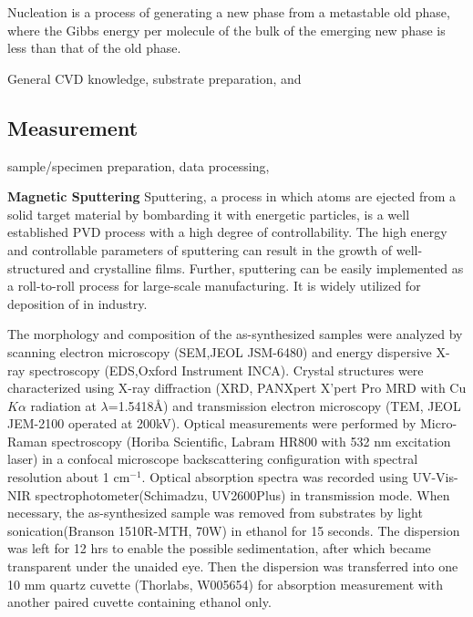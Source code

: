 Nucleation is a process of generating a new phase from a metastable old phase, where the Gibbs energy per molecule of the bulk of the emerging new phase is less than that of the old phase.

  General CVD knowledge, substrate preparation, and\cite{MichealK.Zuraw2003}

\subsection{Measurement}
sample/specimen preparation, data processing,

\textbf{Magnetic Sputtering} Sputtering, a process in which atoms are ejected from a solid target material by bombarding it with energetic particles, is a well established PVD process with a high degree of controllability. The high energy and controllable parameters of sputtering can result in the growth of well-structured and crystalline films. Further, sputtering can be easily implemented as a roll-to-roll process for large-scale manufacturing. It is widely utilized for deposition of  in industry.


The morphology and composition of the as-synthesized samples were analyzed by scanning electron microscopy (SEM,JEOL JSM-6480) and energy dispersive X-ray spectroscopy (EDS,Oxford Instrument INCA). Crystal structures were characterized using X-ray diffraction (XRD, PANXpert X’pert Pro MRD with Cu $K\alpha$ radiation at $\lambda$=1.5418\AA) and transmission electron microscopy (TEM, JEOL JEM-2100  operated at 200kV). Optical measurements were performed by Micro-Raman spectroscopy (Horiba Scientific, Labram HR800 with 532 nm excitation laser) in a confocal microscope backscattering configuration with spectral resolution about 1 cm$^{-1}$. Optical absorption spectra was recorded using UV-Vis-NIR spectrophotometer(Schimadzu, UV2600Plus) in transmission mode. When necessary, the as-synthesized sample was removed from substrates by light sonication(Branson 1510R-MTH, 70W) in ethanol for 15 seconds. The dispersion was left for 12 hrs to enable the possible sedimentation, after which became transparent under the unaided eye. Then the dispersion was transferred into one 10 mm quartz cuvette (Thorlabs, W005654) for absorption measurement with another paired cuvette containing ethanol only.



